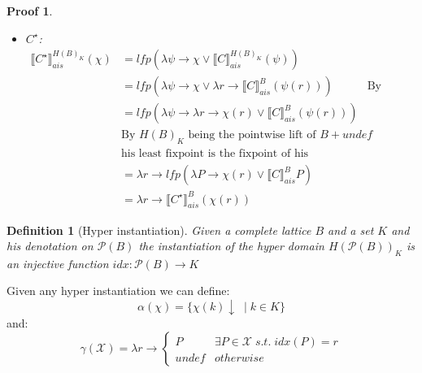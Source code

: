 \documentclass{article}
\newtheorem{definition}{Definition}
\newtheorem{proofs}{Proof}
\def\rr{\rightarrow}
\newcommand*{\sem}[1]{
    \llbracket #1 \rrbracket
}
\newcommand{\bca}[2]{
    #2_{ais}^{#1}
}
\newcommand{\bsem}[2][A]{
    \bca{#1}{\sem{#2}}
}
\newcommand{\pow}[1]{
    \mathcal{P}(#1)
}
\def\rr{\rightarrow}
\begin{document}
\begin{proofs}
\begin{itemize}
            \item $C^\star$:
                \begin{align*}
                    \bsem[H(B)_K]{C^\star}(\chi)
                        &= lfp(\lambda \psi \rr 
                            \chi \lor \bsem[H(B)_K]{C}(\psi)) \\
                        &= lfp(\lambda \psi \rr 
                            \chi \lor \lambda r \rr \bsem[B]{C}(\psi(r)))
                        &\text{By inductive hypothesis} \\
                        &= lfp(\lambda \psi \rr \lambda r \rr
                            \chi(r) \lor \bsem[B]{C}(\psi(r))) \\
                        &\text{By $H(B)_K$ being the pointwise lift of 
                            $B + undef$} \\
                        &\text{his least fixpoint is the fixpoint of his
                            components} \\
                        &= \lambda r \rr lfp(\lambda P 
                            \rr \chi(r) \lor \bsem[B]{C} P) \\
                        &= \lambda r \rr \bsem[B]{C^\star}(\chi(r))
                \end{align*}

        \end{itemize}
    \end{proofs}
    
    \begin{definition}[Hyper instantiation]
        Given a complete lattice $B$ and a set $K$ and his denotation on 
        $\pow{B}$ the instantiation of the hyper domain $H(\pow{B})_K$
        is an injective function $idx : \pow{B} \rr K$
    \end{definition}

    Given any hyper instantiation we can define:
    $$\alpha(\chi) = \{ \chi(k)\downarrow \; \mid k \in K\}$$
    and:
    $$\gamma(\mathcal{X}) = \lambda r \rr \begin{cases}
        P & \exists P \in \mathcal{X} \;s.t. \; idx(P) = r \\
        undef & otherwise
    \end{cases}$$
\end{document}
